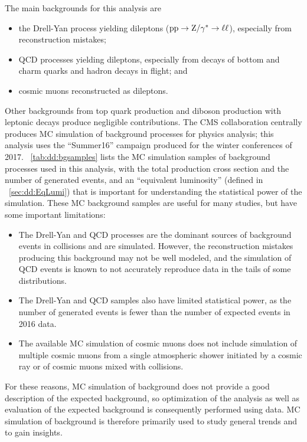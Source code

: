 The main backgrounds for this analysis are
\begin{itemize}
  \item the Drell-Yan process yielding dileptons ($\mathrm{p}\mathrm{p}\to\mathrm{Z}/\gamma^* \to \ell\ell$), especially from reconstruction mistakes;
  \item QCD processes yielding dileptons, especially from decays of bottom and charm quarks and hadron decays in flight; and
  \item cosmic muons reconstructed as dileptons.
\end{itemize}
Other backgrounds from top quark production and diboson production with leptonic decays produce negligible contributions.
The CMS collaboration centrally produces MC simulation of background processes for physics analysis; this analysis uses the ``Summer16'' campaign produced for the winter conferences of 2017.
\Tab~\ref{tab:dd:bgsamples} lists the MC simulation samples of background processes used in this analysis, with the total production cross section and the number of generated events, and an ``equivalent luminosity'' (defined in \Sec~\ref{sec:dd:EqLumi}) that is important for understanding the statistical power of the simulation.
These MC background samples are useful for many studies, but have some important limitations:
\begin{itemize}
  \item The Drell-Yan and QCD processes are the dominant sources of background events in \pp collisions and are simulated. However, the reconstruction mistakes producing this background may not be well modeled, and the simulation of QCD events is known to not accurately reproduce data in the tails of some distributions.
  \item The Drell-Yan and QCD samples also have limited statistical power, as the number of generated events is fewer than the number of expected events in 2016 data.
  \item The available MC simulation of cosmic muons does not include simulation of multiple cosmic muons from a single atmospheric shower initiated by a cosmic ray or of cosmic muons mixed with \pp collisions.
\end{itemize}
For these reasons, MC simulation of background does not provide a good description of the expected background, so optimization of the analysis as well as evaluation of the expected background is consequently performed using data.
MC simulation of background is therefore primarily used to study general trends and to gain insights.

